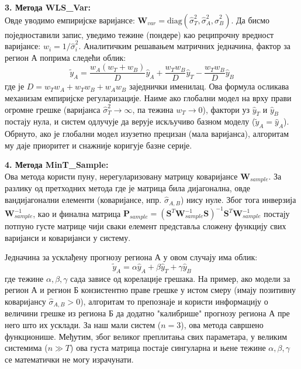 \documentclass[12pt,oneside]{memoir}
\begin{document}
\vspace{0.5em}
\noindent \textbf{3. Метода WLS\_Var:} \\
Овде уводимо емпиријске варијансе: $\mathbf{W}_{var} = \text{diag}(\hat{\sigma}_T^2, \hat{\sigma}_A^2, \hat{\sigma}_B^2)$. Да бисмо поједноставили запис, уведимо тежине (пондере) као реципрочну вредност варијансе: $w_i = 1/\hat{\sigma}_i^2$. Аналитичким решавањем матричних једначина, фактор за регион А поприма следећи облик:
\begin{equation}
    \tilde{y}_A = \frac{w_A(w_T+w_B)}{D}\hat{y}_A + \frac{w_T w_B}{D}\hat{y}_T - \frac{w_T w_B}{D}\hat{y}_B
\end{equation}
где је $D = w_T w_A + w_T w_B + w_A w_B$ заједнички именилац. 
Ова формула осликава механизам емпиријске регуларизације. Наиме ако глобални модел на врху прави огромне грешке (варијанса $\hat{\sigma}_T^2 \to \infty$, па тежина $w_T \to 0$), фактори уз $\hat{y}_T$ и $\hat{y}_B$ постају нула, и систем одлучује да верује искључиво базном моделу ($\tilde{y}_A = \hat{y}_A$). Обрнуто, ако је глобални модел изузетно прецизан (мала варијанса), алгоритам му даје приоритет и снажније коригује базне серије.

\vspace{0.5em}
\noindent \textbf{4. Метода MinT\_Sample:} \\
Ова метода користи пуну, нерегуларизовану матрицу коваријансе $\mathbf{W}_{sample}$. За разлику од претходних метода где је матрица била дијагонална, овде вандијагонални елементи (коваријансе, нпр. $\hat{\sigma}_{A,B}$) нису нуле. Због тога инверзија $\mathbf{W}_{sample}^{-1}$, као и финална матрица $\mathbf{P}_{sample} = (\mathbf{S}^T \mathbf{W}_{sample}^{-1} \mathbf{S})^{-1} \mathbf{S}^T \mathbf{W}_{sample}^{-1}$ постају потпуно густе матрице чији сваки елемент представља сложену функцију свих варијанси и коваријанси у систему. 

Једначина за усклађену прогнозу региона А у овом случају има облик:
\begin{equation}
    \tilde{y}_A = \alpha \hat{y}_A + \beta \hat{y}_T + \gamma \hat{y}_B
\end{equation}
где тежине $\alpha, \beta, \gamma$ сада зависе од корелације грешака. На пример, ако модели за регион А и регион Б конзистентно праве грешке у истом смеру (имају позитивну коваријансу $\hat{\sigma}_{A,B} > 0$), алгоритам то препознаје и користи информацију о величини грешке из региона Б да додатно "калибрише" прогнозу региона А пре него што их усклади. За наш мали систем ($n=3$), ова метода савршено функционише. Међутим, због великог преплитања свих параметара, у великим системима ($n \gg T$) ова густа матрица постаје сингуларна и њене тежине $\alpha, \beta, \gamma$ се математички не могу израчунати.
\end{document}
